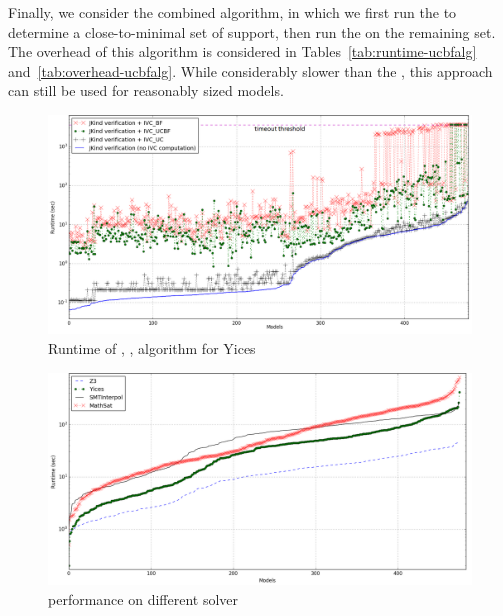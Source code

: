 
Finally, we consider the combined \ucbfalg algorithm, in which we first run the \ucalg to determine a close-to-minimal set of support, then run the \bfalg on the remaining set.  The overhead of this algorithm is considered in Tables~\ref{tab:runtime-ucbfalg} and~\ref{tab:overhead-ucbfalg}.  While considerably slower than the \ucalg, this approach can still be used for reasonably sized models.

\begin{figure}
  \centering
  \includegraphics[width=\textwidth]{figs/timing_analyses.png}
  \caption{Runtime of \ucalg, \bfalg, \ucbfalg algorithm for Yices}\label{fig:runtimeall}
\end{figure}

\begin{figure}
  \centering
  \includegraphics[width=\textwidth]{figs/performance.png}
  \caption{\ucalg performance on different solver}\label{fig:performance}
\end{figure}

